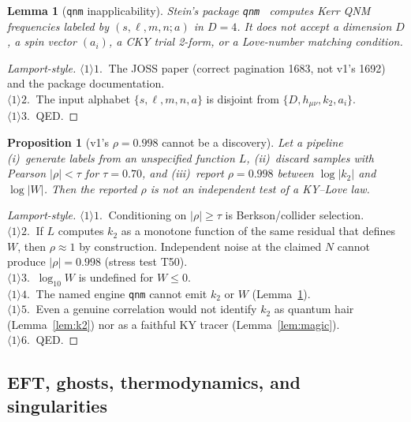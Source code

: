 \documentclass[11pt,a4paper]{article}
\newtheorem{lemma}{Lemma}[section]
\newtheorem{proposition}{Proposition}[section]
\begin{document}
\begin{lemma}[\texttt{qnm} inapplicability]
\label{lem:qnm}
Stein's package \texttt{qnm}~\cite{Stein2019} computes Kerr QNM
frequencies labeled by \((s,\ell,m,n;a)\) in \(D=4\). It does not
accept a dimension \(D\), a spin vector \((a_i)\), a CKY trial 2-form,
or a Love-number matching condition.
\end{lemma}

\begin{proof}[Lamport-style]
\(\langle1\rangle1.\ \) The JOSS paper (correct pagination 1683, not
v1's 1692) and the package documentation.\\
\(\langle1\rangle2.\ \) The input alphabet \(\{s,\ell,m,n,a\}\) is
disjoint from \(\{D,h_{\mu\nu},k_2,a_i\}\).\\
\(\langle1\rangle3.\ \) QED.
\end{proof}

\begin{proposition}[v1's \(\rho=0.998\) cannot be a discovery]
\label{prop:rho}
Let a pipeline (i)~generate labels from an unspecified function \(L\),
(ii)~discard samples with Pearson \(|\rho|<\tau\) for \(\tau=0.70\),
and (iii)~report \(\rho=0.998\) between \(\log|k_2|\) and \(\log|W|\).
Then the reported \(\rho\) is not an independent test of a KY--Love law.
\end{proposition}

\begin{proof}[Lamport-style]
\(\langle1\rangle1.\ \) Conditioning on \(|\rho|\ge\tau\) is
Berkson/collider selection.\\
\(\langle1\rangle2.\ \) If \(L\) computes \(k_2\) as a monotone function
of the same residual that defines \(W\), then \(\rho\approx1\) by
construction. Independent noise at the claimed \(N\) cannot produce
\(|\rho|=0.998\) (stress test T50).\\
\(\langle1\rangle3.\ \) \(\log_{10}W\) is undefined for \(W\le0\).\\
\(\langle1\rangle4.\ \) The named engine \texttt{qnm} cannot emit
\(k_2\) or \(W\) (Lemma~\ref{lem:qnm}).\\
\(\langle1\rangle5.\ \) Even a genuine correlation would not identify
\(k_2\) as quantum hair (Lemma~\ref{lem:k2}) nor as a faithful KY
tracer (Lemma~\ref{lem:magic}).\\
\(\langle1\rangle6.\ \) QED.
\end{proof}

\subsection{EFT, ghosts, thermodynamics, and singularities}
\end{document}
